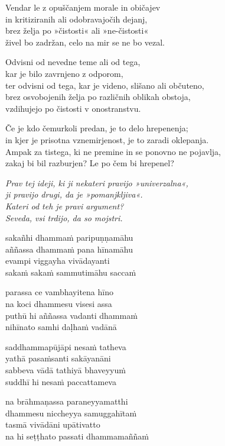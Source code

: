 Vendar le z opuščanjem morale in običajev\\
in kritiziranih ali odobravajočih dejanj,\\
brez želja po »čistosti« ali »ne-čistosti«\\
živel bo zadržan, celo na mir se ne bo vezal.

Odvisni od nevedne teme ali od tega,\\\vin kar je bilo zavrnjeno z odporom,\\
ter odvisni od tega, kar je videno, slišano ali občuteno,\\
brez osvobojenih želja po različnih oblikah obstoja,\\
vzdihujejo po čistosti v onostranstvu.

Če je kdo čemurkoli predan, je to delo hrepenenja;\\
in kjer je prisotna vznemirjenost, je to zaradi oklepanja.\\
Ampak za tistega, ki ne premine in se ponovno ne pojavlja,\\
zakaj bi bil razburjen? Le po čem bi hrepenel?

\emph{Prav tej ideji, ki ji nekateri pravijo »univerzalna«,}\\
\emph{ji pravijo drugi, da je »pomanjkljiva«.}\\
\emph{Kateri od teh je pravi argument?}\\
\emph{Seveda, vsi trdijo, da so mojstri.}


\clearpage

sakañhi dhammaṁ paripuṇṇamāhu\\
aññassa dhammaṁ pana hīnamāhu\\
evampi viggayha vivādayanti\\
sakaṁ sakaṁ sammutimāhu saccaṁ

parassa ce vambhayitena hīno\\
na koci dhammesu visesi assa\\
puthū hi aññassa vadanti dhammaṁ\\
nihīnato samhi daḷhaṁ vadānā

saddhammapūjāpi nesaṁ tatheva\\
yathā pasaṁsanti sakāyanāni\\
sabbeva vādā tathiyā bhaveyyuṁ\\
suddhī hi nesaṁ paccattameva

na brāhmaṇassa paraneyyamatthi\\
dhammesu niccheyya samuggahītaṁ\\
tasmā vivādāni upātivatto\\
na hi seṭṭhato passati dhammamaññaṁ

